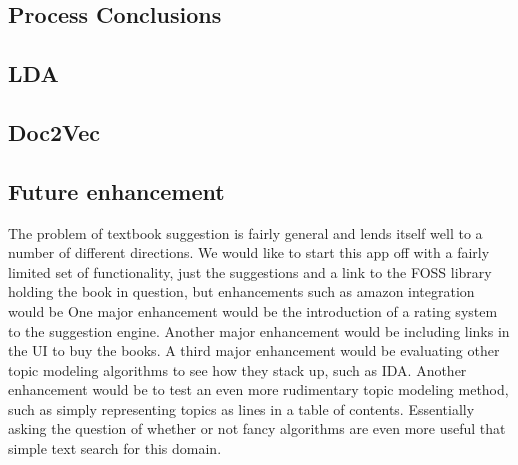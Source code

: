 
\subsection{Process Conclusions}
\label{sec:conc:process-conclusions}

\subsection{LDA}
\label{sec:conc:lda}

\subsection{Doc2Vec}
\label{sec:conc:doc2vec}



\subsection{Future enhancement}
The problem of textbook suggestion is fairly general and lends itself well to a number of different directions.
We would like to start this app off with a fairly limited set of functionality, just the suggestions and a link to the FOSS library holding the book in question, but enhancements such as amazon integration would be 
One major enhancement would be the introduction of a rating system to the suggestion engine.  
Another major enhancement would be including links in the UI to buy the books.
A third major enhancement would be evaluating other topic modeling algorithms to see how they stack up, such as IDA.
Another enhancement would be to test an even more rudimentary topic modeling method, such as simply representing topics as lines in a table of contents.  
Essentially asking the question of whether or not fancy algorithms are
even more useful that simple text search for this domain.

